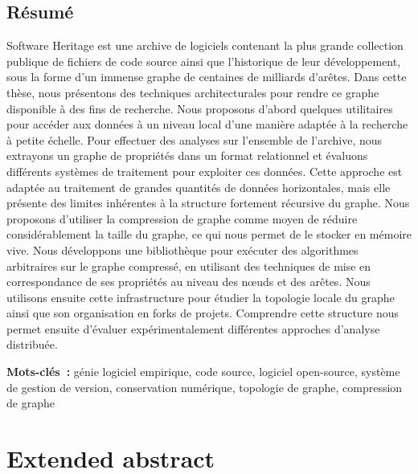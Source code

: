 \begin{minipage}[b][0.49\textheight][t]{\textwidth}
\vspace{6mm}

\section*{Résumé}
\begin{SingleSpace}

Software Heritage est une archive de logiciels contenant la plus
grande collection publique de fichiers de code source ainsi que l'historique de
leur développement, sous la forme d'un immense graphe de centaines de milliards
d'arêtes. Dans cette thèse, nous présentons des techniques architecturales pour
rendre ce graphe disponible à des fins de recherche. Nous proposons d'abord
quelques utilitaires pour accéder aux données à un niveau local d'une manière
adaptée à la recherche à petite échelle. Pour effectuer des analyses sur
l'ensemble de l'archive, nous extrayons un graphe de propriétés dans un format
relationnel et évaluons différents systèmes de traitement pour exploiter ces
données. Cette approche est adaptée au traitement de grandes quantités de
données horizontales, mais elle présente des limites inhérentes à la structure
fortement récursive du graphe. Nous proposons d'utiliser la compression de
graphe comme moyen de réduire considérablement la taille du graphe, ce qui nous
permet de le stocker en mémoire vive. Nous développons une bibliothèque pour
exécuter des algorithmes arbitraires sur le graphe compressé, en utilisant
des techniques de mise en correspondance de ses propriétés au
niveau des nœuds et des arêtes. Nous utilisons ensuite cette infrastructure
pour étudier la topologie locale du graphe ainsi que son organisation en forks
de projets. Comprendre cette structure nous permet ensuite
d'évaluer expérimentalement différentes approches d'analyse distribuée.

\vspace{3mm}

\textbf{Mots-clés~:} génie logiciel empirique, code source, logiciel
open-source, système de gestion de version, conservation numérique, topologie
de graphe, compression de graphe

\end{SingleSpace}
\end{minipage}

\clearpage

\chapter*{Extended abstract}

